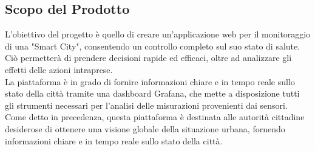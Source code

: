 \subsection{Scopo del Prodotto}
L'obiettivo del progetto è quello di creare un'applicazione web per il monitoraggio di una "Smart City", consentendo un controllo completo sul suo stato di salute. Ciò permetterà di prendere decisioni rapide ed efficaci, oltre ad analizzare gli effetti delle azioni intraprese.\\
La piattaforma è in grado di fornire informazioni chiare e in tempo reale sullo stato della città tramite una dashboard Grafana, che mette a disposizione tutti gli strumenti necessari per l'analisi delle misurazioni provenienti dai sensori. \\
Come detto in precedenza, questa piattaforma è destinata alle autorità cittadine desiderose di ottenere una visione globale della situazione urbana, fornendo informazioni chiare e in tempo reale sullo stato della città.